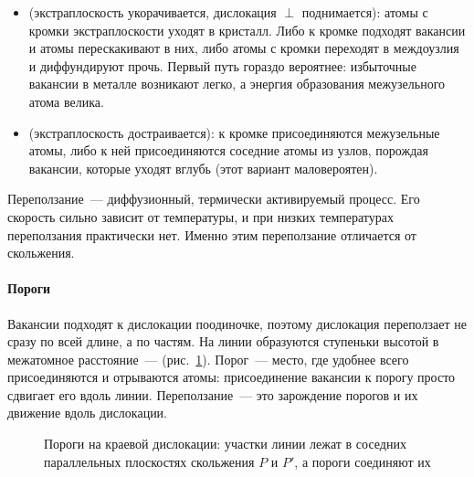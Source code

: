 \begin{itemize}
\item {} (экстраплоскость укорачивается,
дислокация $\perp$ поднимается): атомы с кромки экстраплоскости уходят
в кристалл. Либо к кромке подходят вакансии и атомы перескакивают в
них, либо атомы с кромки переходят в междоузлия и диффундируют прочь.
Первый путь гораздо вероятнее: избыточные вакансии в металле возникают
легко, а энергия образования межузельного атома велика.
\item {} (экстраплоскость
достраивается): к кромке присоединяются межузельные атомы, либо к ней
присоединяются соседние атомы из узлов, порождая вакансии, которые
уходят вглубь (этот вариант маловероятен).
\end{itemize}

\begin{glavnoe}
Переползание~— диффузионный, термически активируемый процесс. Его
скорость сильно зависит от температуры, и при низких температурах
переползания практически нет. Именно этим переползание отличается от
скольжения.
\end{glavnoe}

\paragraph{Пороги}
Вакансии подходят к дислокации поодиночке, поэтому дислокация переползает
не сразу по всей длине, а по частям. На линии образуются ступеньки
высотой в межатомное расстояние~— 
(рис.~\ref{fig:jogs}). Порог~— место, где удобнее всего присоединяются и
отрываются атомы: присоединение вакансии к порогу просто сдвигает его
вдоль линии. Переползание~— это зарождение порогов и их движение вдоль
дислокации.

\begin{figure}[ht]
\centering
{}
\caption{Пороги на краевой дислокации: участки линии лежат в соседних
параллельных плоскостях скольжения $P$ и $P'$, а пороги соединяют их}
\label{fig:jogs}
\end{figure}

